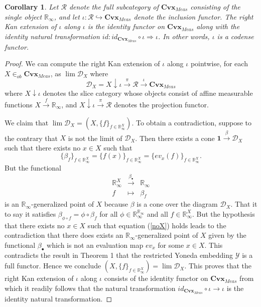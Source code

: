 \documentclass[11pt]{amsart}    %
\newtheorem{corollary}{Corollary}
\newcommand{\Rinf}{\mathbb{R}_{\infty}}
\newcommand{\be}{\begin{equation}}
\newcommand{\ee}{\end{equation}}
\newcommand{\D}{\mathcal{D}}
\newcommand{\R}{\mathcal{R}}
\newcommand{\Y}{\mathcal{Y}}
\newcommand{\one}{\mathbf{1}}
\begin{document}
\begin{corollary} Let $\mathcal{R}$ denote the full subcategory of $\mathbf{Cvx}_{Meas}$ consisting of the single object $\mathbb{R}_{\infty}$, and let $\iota: \R \hookrightarrow \mathbf{Cvx}_{Meas}$ denote the inclusion functor.  The right Kan extension of $\iota$  along $\iota$ is  the identity functor on $\mathbf{Cvx}_{Meas}$ along with the identity natural transformation $id: id_{\mathbf{Cvx}_{Meas}} \circ \iota \Rightarrow \iota$.  In other words, $\iota$ is a codense functor.
\end{corollary}
\begin{proof}
We can compute the right Kan extension of $\iota$ along $\iota$ pointwise, for each $X \in_{ob} \mathbf{Cvx}_{Meas}$, as $\lim \mathcal{D}_X$ where
$$
\D_X = X \downarrow \iota \xrightarrow{\pi} \mathcal{R} \xrightarrow{\iota} \mathbf{Cvx}_{Meas}
$$
where  $X\downarrow \iota$ denotes the slice category whose objects consist of affine measurable functions $X \xrightarrow{f} \mathbb{R}_{\infty}$, and  $X \downarrow \iota \xrightarrow{\pi} \mathcal{R}$ denotes the projection functor.

We claim that $\lim \D_X = (X, \{f\}_{f \in \mathbb{R}_{\infty}^X})$.   To obtain a contradiction, suppose to the contrary that $X$ is not the limit of $\D_X$.  Then there exists a cone $\one \xrightarrow{\beta} \D_X$  such that there exists no $x \in X$ such that 
\be \label{noX}
\{\beta_f\}_{f \in \mathbb{R}_{\infty}^X}  = \{f(x)\}_{f \in \mathbb{R}_{\infty}^X} = \{ ev_x(f) \}_{f \in \mathbb{R}_{\infty}^X}.
\ee
But  the functional 
\be \nonumber
\begin{array}{ccc}
\Rinf^X & \xrightarrow{\beta_{\bullet}} & \Rinf \\
f & \mapsto & \beta_f
\end{array}
\ee
 is an $\Rinf$-generalized point of $X$  because $\beta$ is a cone over the diagram $\D_X$.   That it to say it satisfies $\beta_{\phi \circ f} = \phi \circ \beta_f$ for all $\phi \in \Rinf^{\Rinf}$ and all $f \in \Rinf^X$.   
But the hypothesis  that there exists no $x \in X$ such that equation (\ref{noX}) holds leads to the contradiction that there does exists an $\Rinf$-generalized point of $X$ given by the functional $\beta_{\bullet}$ which is not an evaluation map $ev_x$ for some $x \in X$.  This contradicts the result in Theorem 1  that the restricted Yoneda embedding $\Y$ is a full functor.   Hence we conclude $(X, \{f\}_{f \in \mathbb{R}_{\infty}^X})= \lim \D_X$.  This proves that the right Kan extension of $\iota$ along $\iota$ consists of  the identity functor on $\mathbf{Cvx}_{Meas}$  from which it readily follows that  the natural transformation $id_{\mathbf{Cvx}_{Meas}} \circ \iota \rightarrow \iota$ is the identity natural transformation.

\end{proof}
\end{document}
